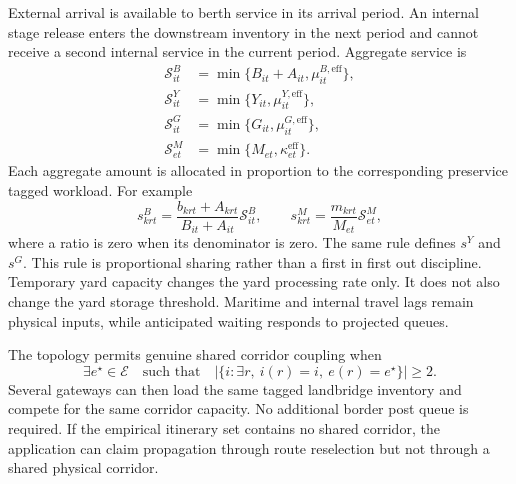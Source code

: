 \documentclass[a4paper,fleqn]{cas-sc}
\begin{document}
External arrival is available to berth service in its arrival period. An
internal stage release enters the downstream inventory in the next period and
cannot receive a second internal service in the current period. Aggregate
service is
\begin{subequations}\label{eq:work-conserving}
\begin{align}
 \mathcal S^B_{it}
 &=\min\{B_{it}+A_{it},\mu^{B,\mathrm{eff}}_{it}\},\\
 \mathcal S^Y_{it}
 &=\min\{Y_{it},\mu^{Y,\mathrm{eff}}_{it}\},\\
 \mathcal S^G_{it}
 &=\min\{G_{it},\mu^{G,\mathrm{eff}}_{it}\},\\
 \mathcal S^M_{et}
 &=\min\{M_{et},\kappa^{\mathrm{eff}}_{et}\}.
\end{align}
\end{subequations}
Each aggregate amount is allocated in proportion to the corresponding
preservice tagged workload. For example
\begin{equation}
 s^B_{krt}=
 \frac{b_{krt}+A_{krt}}{B_{it}+A_{it}}\mathcal S^B_{it},
 \qquad
 s^M_{krt}=\frac{m_{krt}}{M_{et}}\mathcal S^M_{et},
 \label{eq:proportional-service}
\end{equation}
where a ratio is zero when its denominator is zero. The same rule defines
$s^Y$ and $s^G$. This rule is proportional sharing rather than a first in first
out discipline. Temporary yard capacity changes the yard processing rate only.
It does not also change the yard storage threshold. Maritime and internal
travel lags remain physical inputs, while anticipated waiting responds to
projected queues.

The topology permits genuine shared corridor coupling when
\begin{equation}
 \exists e^\star\in\mathcal E
 \quad\text{such that}\quad
 \left|\{i:\exists r,\ i(r)=i,\ e(r)=e^\star\}\right|\ge2.
 \label{eq:shared-corridor}
\end{equation}
Several gateways can then load the same tagged landbridge inventory and compete
for the same corridor capacity. No additional border post queue is required.
If the empirical itinerary set contains no shared corridor, the application
can claim propagation through route reselection but not through a shared
physical corridor.
\end{document}

